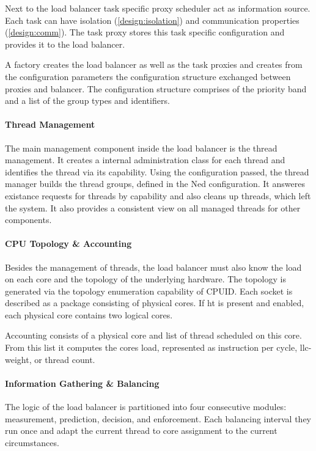 Next to the load balancer task specific proxy scheduler act as information
source.
Each task can have isolation (\ref{design:isolation}) and communication
properties (\ref{design:comm}).
The task proxy stores this task specific configuration and provides it to the
load balancer.

A factory creates the load balancer as well as the task proxies and creates
from the configuration parameters the configuration structure exchanged between
proxies and balancer.
The configuration structure comprises of the priority band and a list of
the group types and identifiers.


\paragraph{Thread Management}
The main management component inside the load balancer is the thread
management.
It creates a internal administration class for each thread and identifies the
thread via its capability.
Using the configuration passed, the thread manager builds the thread groups,
defined in the Ned configuration.
It answeres existance requests for threads by capability and also cleans up
threads, which left the system.
It also provides a consistent view on all managed threads for other components.


\paragraph{CPU Topology \& Accounting}
Besides the management of threads, the load balancer must also know the load on
each core and the topology of the underlying hardware.
The topology is generated via the topology enumeration capability of CPUID.
Each socket is described as a package consisting of physical cores.
If \gls{ht} is present and enabled, each physical core contains two logical
cores.

Accounting consists of a physical core and list of thread scheduled on this
core.
From this list it computes the cores load, represented as instruction
per cycle, \gls{llc}-weight, or thread count.


\paragraph{Information Gathering \& Balancing}
The logic of the load balancer is partitioned into four consecutive modules:
measurement, prediction, decision, and enforcement.
Each balancing interval they run once and adapt the current thread to core
assignment to the current circumstances.

